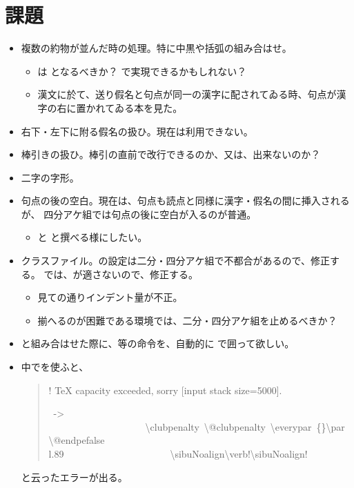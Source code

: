 \documentclass[12pt,landscape,hiragino-pro]{ltjtarticle}
\begin{document}
\section{課題}
\begin{itemize}
		\item 複数の約物が並んだ時の処理。特に中黒や括弧の組み合はせ。
			\begin{itemize}
					\item {}は
					となるべきか？
					で実現できるかもしれない？
					\item 漢文に於て、送り假名と句点が同一の漢字に配されてゐる時、句点が漢字の右に置かれてゐる本を見た。
			\end{itemize}
		\item 右下・左下に附る假名の扱ひ。現在は利用できない。
		\item 棒引きの扱ひ。棒引の直前で改行できるのか、又は、出来ないのか？
		\item 二字の字形。
		\item 句点の後の空白。現在は、句点も読点と同様に漢字・假名の間に挿入されるが、
			  四分アケ組では句点の後に空白が入るのが普通。
			\begin{itemize}
					\item {}と
					と撰べる様にしたい。
			\end{itemize}
		\item クラスファイル。の設定は二分・四分アケ組で不都合があるので、修正する。
			では、が適さないので、修正する。
			\begin{itemize}
					\item 見ての通りインデント量が不正。
					\item 揃へるのが困難である環境では、二分・四分アケ組を止めるべきか？
			\end{itemize}
		\item {}と組み合はせた際に、等の命令を、自動的に
			で囲って欲しい。
		\item {}中でを使ふと、
			\begin{quote}\ttfamily
! TeX capacity exceeded, sorry [input stack size=5000].\\
\par~->\@restorepar~\\
~~~~~~~~~~~~~~~~~~~~\textbackslash clubpenalty~\textbackslash @clubpenalty~\textbackslash everypar~\{\}\textbackslash par~\textbackslash @endpefalse\\
l.89~~~~~~~~~~~~~~~~~~~~~~\textbackslash sibuNoalign{\textbackslash verb!\textbackslash sibuNoalign!}
			\end{quote}
			と云ったエラーが出る。
\end{itemize}
\end{document}
